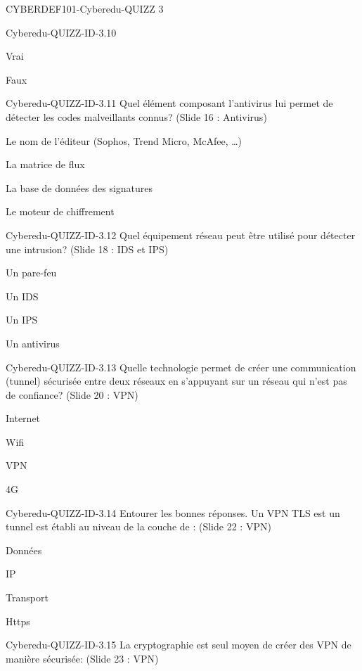 \documentclass[12pt]{article}
\begin{document}
\begin{quiz}{CYBERDEF101-Cyberedu-QUIZZ 3}
\begin{multi}[multiple=true]{Cyberedu-QUIZZ-ID-3.10}
\item Vrai
\item* Faux
\end{multi}
\begin{multi}[multiple=true]{Cyberedu-QUIZZ-ID-3.11}
	Quel \'el\'ement composant l'antivirus lui permet de d\'etecter les codes malveillants connus?  (Slide 16 : Antivirus)
\item Le nom de l'\'editeur (Sophos, Trend Micro, McAfee, …)
\item La matrice de flux
\item* La base de donn\'ees des signatures
\item Le moteur de chiffrement
\end{multi}
\begin{multi}[multiple=true]{Cyberedu-QUIZZ-ID-3.12}
	Quel \'equipement r\'eseau peut \^etre utilis\'e pour d\'etecter une intrusion? (Slide 18 : IDS et IPS)
\item Un pare-feu
\item* Un IDS
\item Un IPS
\item Un antivirus
\end{multi}
\begin{multi}[multiple=true]{Cyberedu-QUIZZ-ID-3.13}
	Quelle technologie permet de cr\'eer une communication (tunnel) s\'ecuris\'ee entre deux r\'eseaux en s'appuyant sur un r\'eseau qui n'est pas de confiance? (Slide 20 : VPN)
\item Internet
\item Wifi
\item* VPN
\item 4G
\end{multi}
\begin{multi}[multiple=true]{Cyberedu-QUIZZ-ID-3.14}
	Entourer les bonnes r\'eponses.  Un VPN TLS est un tunnel est \'etabli au niveau de la couche de  : (Slide 22 : VPN)
\item Donn\'ees
\item IP
\item* Transport
\item Https
\end{multi}
\begin{multi}[multiple=true]{Cyberedu-QUIZZ-ID-3.15}
	La cryptographie est seul moyen de cr\'eer des VPN de mani\`ere s\'ecuris\'ee: (Slide 23 : VPN)

\end{multi}
\end{quiz}
\end{document}
